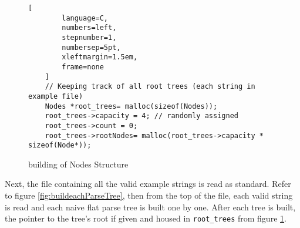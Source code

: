 \begin{figure}[H]
    \begin{lstlisting}[
        language=C,
        numbers=left,
        stepnumber=1,
        numbersep=5pt,
        xleftmargin=1.5em,
        frame=none
    ]
    // Keeping track of all root trees (each string in example file)
    Nodes *root_trees= malloc(sizeof(Nodes)); 
    root_trees->capacity = 4; // randomly assigned
    root_trees->count = 0;
    root_trees->rootNodes= malloc(root_trees->capacity * sizeof(Node*));

    \end{lstlisting}

\caption{building of Nodes Structure}
\label{fig:rootNodes}
\end{figure}

Next, the file containing all the valid example strings is read as standard. Refer to figure \ref{fig:buildeachParseTree}, then from the top of the file, each valid string is read and each naive flat parse tree is built one by one. After each tree is built, the pointer to the tree's root if given and housed in \texttt{root\_trees} from figure \ref{fig:rootNodes}. 

